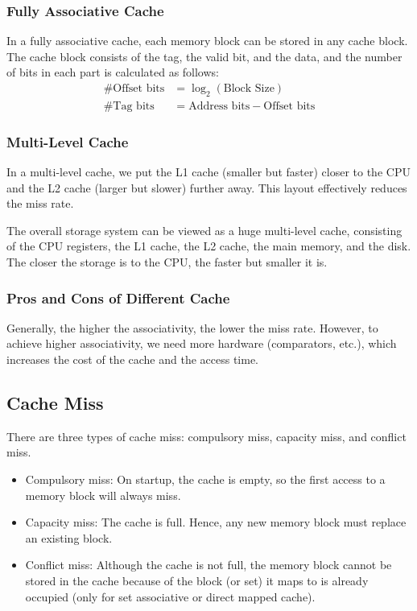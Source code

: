 \documentclass[a4paper,12pt]{article}
\begin{document}
\subsubsection{Fully Associative Cache}

In a fully associative cache, each memory block can be stored in any cache block. The cache block consists of the tag, the valid bit, and the data, and the number of bits in each part is calculated as follows:
\begin{align*}
	\#\text{Offset bits} &= \log_2(\text{Block Size}) \\
	\#\text{Tag bits} &= \text{Address bits} - \text{Offset bits}
\end{align*}

\subsubsection{Multi-Level Cache}

In a multi-level cache, we put the L1 cache (smaller but faster) closer to the CPU and the L2 cache (larger but slower) further away. This layout effectively reduces the miss rate.

\begin{tipsbox}
	The overall storage system can be viewed as a huge multi-level cache, consisting of the CPU registers, the L1 cache, the L2 cache, the main memory, and the disk. The closer the storage is to the CPU, the faster but smaller it is.
\end{tipsbox}

\subsubsection{Pros and Cons of Different Cache}

Generally, the higher the associativity, the lower the miss rate. However, to achieve higher associativity, we need more hardware (comparators, etc.), which increases the cost of the cache and the access time. 

\subsection{Cache Miss}

There are three types of cache miss: compulsory miss, capacity miss, and conflict miss.
\begin{itemize}
	\item Compulsory miss: On startup, the cache is empty, so the first access to a memory block will always miss.
	\item Capacity miss: The cache is full. Hence, any new memory block must replace an existing block.
	\item Conflict miss: Although the cache is not full, the memory block cannot be stored in the cache because of the block (or set) it maps to is already occupied (only for set associative or direct mapped cache).
\end{itemize}
\end{document}
